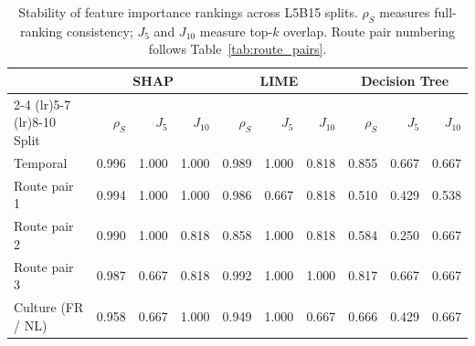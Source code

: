 \begin{table}[ht]
\caption{Stability of feature importance rankings across L5B15 splits. $\rho_S$ measures full-ranking consistency; $J_5$ and $J_{10}$ measure top-$k$ overlap. Route pair numbering follows Table~\ref{tab:route_pairs}.}
\label{tab:stability_l5b15}
\centering
\begin{tabular}{l rrr rrr rrr}
\toprule
 & \multicolumn{3}{c}{SHAP} & \multicolumn{3}{c}{LIME} & \multicolumn{3}{c}{Decision Tree} \\
\cmidrule(lr){2-4} \cmidrule(lr){5-7} \cmidrule(lr){8-10}
Split & $\rho_S$ & $J_5$ & $J_{10}$ & $\rho_S$ & $J_5$ & $J_{10}$ & $\rho_S$ & $J_5$ & $J_{10}$ \\
\midrule
Temporal & 0.996 & 1.000 & 1.000 & 0.989 & 1.000 & 0.818 & 0.855 & 0.667 & 0.667 \\
Route pair 1 & 0.994 & 1.000 & 1.000 & 0.986 & 0.667 & 0.818 & 0.510 & 0.429 & 0.538 \\
Route pair 2 & 0.990 & 1.000 & 0.818 & 0.858 & 1.000 & 0.818 & 0.584 & 0.250 & 0.667 \\
Route pair 3 & 0.987 & 0.667 & 0.818 & 0.992 & 1.000 & 1.000 & 0.817 & 0.667 & 0.667 \\
Culture (FR / NL) & 0.958 & 0.667 & 1.000 & 0.949 & 1.000 & 0.667 & 0.666 & 0.429 & 0.667 \\
\bottomrule
\end{tabular}
\end{table}
